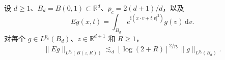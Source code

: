 设 $d\geq 1$、$B_d=B(0,1)\subset\mathbb R^d$、$p_c=2(d+1)/d$，以及
\[
Eg(x,t)=\int_{B_d}e^{\mathrm i(x\cdot v+t|v|^2)}g(v)\,\mathrm dv.
\]
对每个 $g\in L^{p_c}(B_d)$、$z\in\mathbb R^{d+1}$ 和 $R\geq 1$，
\[
\|Eg\|_{L^{p_c}(B(z,R))}
 \lesssim_d[\log(2+R)]^{2/p_c}\|g\|_{L^{p_c}(B_d)}.
\]
